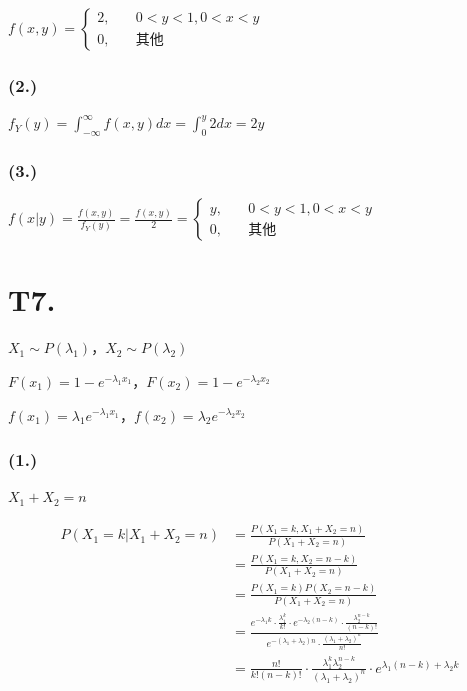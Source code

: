 \documentclass{article}
\newcommand\f[2]{\frac{#1}{#2}}
\begin{document}
$
    f(x,y)=
    \begin{cases}
        2, &\quad 0<y<1,0<x<y\\
        0, &\quad \text{其他}
    \end{cases}
$

\subsubsection*{(2.)}

$f_Y(y)=\int_{-\infty}^{\infty}f(x,y)dx=\int_{0}^{y}2dx=2y$

\subsubsection*{(3.)}

$
    f(x|y)=\f{f(x,y)}{f_Y(y)}=\f{f(x,y)}{2}=
    \begin{cases}
        y, &\quad 0<y<1,0<x<y\\
        0, &\quad \text{其他}
    \end{cases}
$

\section*{T7. }

$X_1\sim P(\lambda_1)$，$X_2\sim P(\lambda_2)$

$F(x_1)=1-e^{-\lambda_1x_1}$，$F(x_2)=1-e^{-\lambda_2x_2}$

$f(x_1)=\lambda_1e^{-\lambda_1x_1}$，$f(x_2)=\lambda_2e^{-\lambda_2x_2}$

\subsubsection*{(1.)}

$X_1+X_2=n$

\begin{equation}
    \begin{aligned}
        P(X_1=k|X_1+X_2=n)
        & = \f{P(X_1=k,X_1+X_2=n)}{P(X_1+X_2=n)}\\
        & = \f{P(X_1=k,X_2=n-k)}{P(X_1+X_2=n)}\\
        & = \f{P(X_1=k)P(X_2=n-k)}{P(X_1+X_2=n)}\\
        & = \f{e^{-\lambda_1k}\cdot\f{\lambda_1^k}{k!}\cdot e^{-\lambda_2(n-k)}\cdot\f{\lambda_2^{n-k}}{(n-k)!}}{e^{-(\lambda_1+\lambda_2)n}\cdot\f{(\lambda_1+\lambda_2)^n}{n!}}\\
        & = \f{n!}{k!(n-k)!}\cdot\f{\lambda_1^k\lambda_2^{n-k}}{(\lambda_1+\lambda_2)^n}\cdot e^{\lambda_1(n-k)+\lambda_2k}\\
    \end{aligned}
\end{equation}
\end{document}
